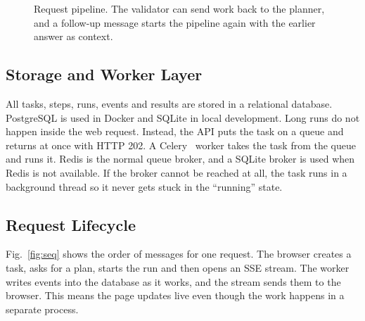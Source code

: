 \documentclass[conference]{IEEEtran}
\begin{document}
\begin{figure}[!t]
\centering
{}
\caption{Request pipeline. The validator can send work back to the planner, and a follow-up message
starts the pipeline again with the earlier answer as context.}
\label{fig:pipeline}
\end{figure}

\subsection{Storage and Worker Layer}
All tasks, steps, runs, events and results are stored in a relational database. PostgreSQL is used in
Docker and SQLite in local development. Long runs do not happen inside the web request. Instead, the API
puts the task on a queue and returns at once with HTTP 202. A Celery~\cite{celery} worker takes the task
from the queue and runs it. Redis is the normal queue broker, and a SQLite broker is used when Redis is
not available. If the broker cannot be reached at all, the task runs in a background thread so it never
gets stuck in the ``running'' state.

\subsection{Request Lifecycle}
Fig.~\ref{fig:seq} shows the order of messages for one request. The browser creates a task, asks for a
plan, starts the run and then opens an SSE stream. The worker writes events into the database as it
works, and the stream sends them to the browser. This means the page updates live even though the work
happens in a separate process.
\end{document}
